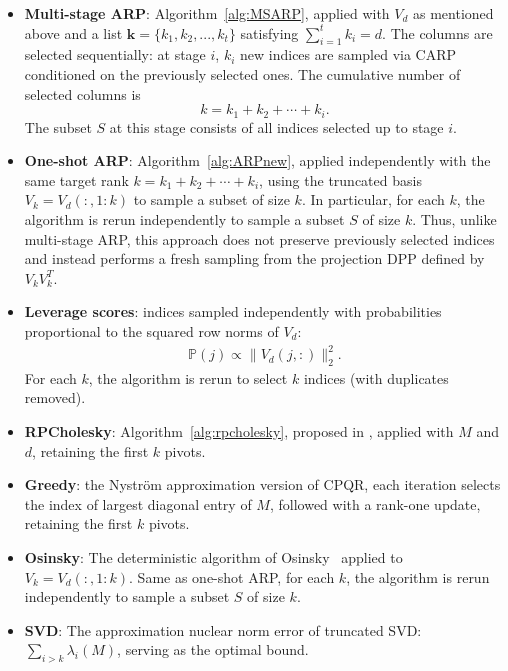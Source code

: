 \documentclass[11pt]{article}
\newcommand{\be}{\begin{eqnarray}}
\newcommand{\ee}{\end{eqnarray}}
\newcommand{\<}{\langle}
\renewcommand{\>}{\rangle}
\begin{document}
\begin{itemize}
    \item \textbf{Multi-stage ARP}: Algorithm~\ref{alg:MSARP}, applied with $V_{d}$ as mentioned above and a list $\mathbf{k} = \{k_1,k_2,...,k_t\}$ satisfying $\sum_{i=1}^t k_i = d$. The columns are selected sequentially: at stage $i$, $k_i$ new indices are sampled via CARP conditioned on the previously selected ones. The cumulative number of selected columns is
\[
k = k_1 + k_2 + \cdots + k_i.
\]
The subset $S$ at this stage consists of all indices selected up to stage $i$.

    \item \textbf{One-shot ARP}: Algorithm~\ref{alg:ARPnew}, applied independently with the same target rank $k = k_1 + k_2 + \cdots + k_i$, using the truncated basis $V_k = V_d(:,1:k)$ to sample a subset of size $k$. In particular, for each $k$, the algorithm is rerun independently to sample a subset $S$ of size $k$. Thus, unlike multi-stage ARP, this approach does not preserve previously selected indices and instead performs a fresh sampling from the projection DPP defined by $V_k V_k^T$.

    \item \textbf{Leverage scores}: indices sampled independently with probabilities proportional to the squared row norms of $V_d$:
    \be
    \mathbb{P}(j) \propto \|V_d(j,:)\|_2^2.
    \ee
    For each $k$, the algorithm is rerun to select $k$ indices (with duplicates removed). 

    \item \textbf{RPCholesky}: Algorithm~\ref{alg:rpcholesky}, proposed in \cite{RPCholesky}, applied with $M$ and $d$, retaining the first $k$ pivots.
    \item \textbf{Greedy}: the Nystr\"{o}m approximation version of CPQR, each iteration selects the index of largest diagonal entry of $M$, followed with a rank-one update, retaining the first $k$ pivots.

    \item \textbf{Osinsky}: The deterministic algorithm of Osinsky~\cite{OSINSKY2025359} applied to $V_{k} = V_d(:,1:k)$. Same as one-shot ARP, for each $k$, the algorithm is rerun independently to sample a subset $S$ of size $k$.

    \item \textbf{SVD}: The  approximation nuclear norm error of truncated SVD: $\sum\limits_{i>k} \lambda_i(M)$, serving as the optimal bound.
\end{itemize}
\end{document}
